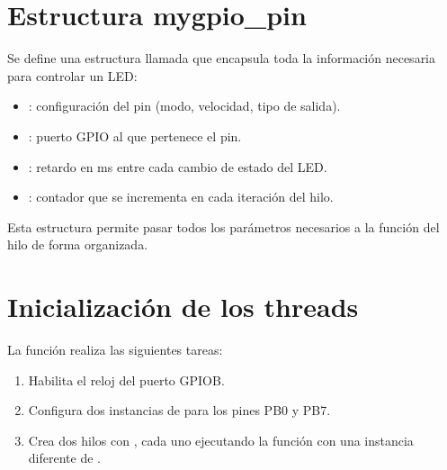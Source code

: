 \documentclass[letterpaper,10pt,english]{sphinxmanual}
\begin{document}
\section{Estructura mygpio\_pin}
\label{\detokenize{ejemplothreads:estructura-mygpio-pin}}
\sphinxAtStartPar
Se define una estructura llamada  que encapsula toda la información necesaria para controlar un LED:
\begin{itemize}
\item {} 
\sphinxAtStartPar
{}: configuración del pin (modo, velocidad, tipo de salida).

\item {} 
\sphinxAtStartPar
{}: puerto GPIO al que pertenece el pin.

\item {} 
\sphinxAtStartPar
{}: retardo en ms entre cada cambio de estado del LED.

\item {} 
\sphinxAtStartPar
{}: contador que se incrementa en cada iteración del hilo.

\end{itemize}

\sphinxAtStartPar
Esta estructura permite pasar todos los parámetros necesarios a la función del hilo de forma organizada.


\section{Inicialización de los threads}
\label{\detokenize{ejemplothreads:inicializacion-de-los-threads}}
\sphinxAtStartPar
La función  realiza las siguientes tareas:
\begin{enumerate}
%
\item {} 
\sphinxAtStartPar
Habilita el reloj del puerto GPIOB.

\item {} 
\sphinxAtStartPar
Configura dos instancias de  para los pines PB0 y PB7.

\item {} 
\sphinxAtStartPar
Crea dos hilos con , cada uno ejecutando la función  con una instancia diferente de .

\end{enumerate}
\end{document}
